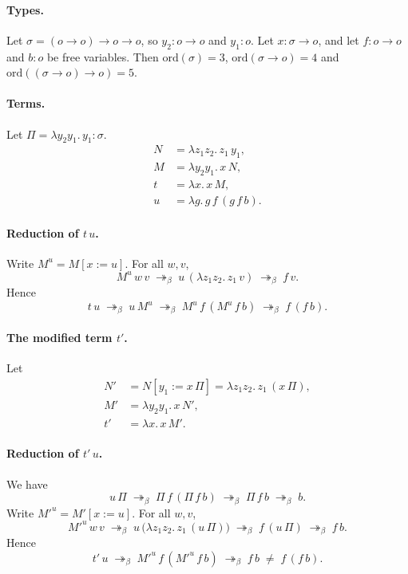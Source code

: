 \documentclass{article}
\newcommand{\red}{\twoheadrightarrow_\beta}
\begin{document}
\paragraph{Types.}
Let $\sigma = (o\to o)\to o\to o$, so $y_2 : o\to o$ and $y_1 : o$.
Let $x : \sigma\to o$, and let $f : o\to o$ and $b : o$ be free variables.
Then $\mathrm{ord}(\sigma) = 3$, $\mathrm{ord}(\sigma\to o) = 4$ and
$\mathrm{ord}((\sigma\to o)\to o) = 5$.

\paragraph{Terms.}
Let $\Pi = \lambda y_2 y_1.\,y_1 : \sigma$.
\begin{align*}
  N &= \lambda z_1 z_2.\, z_1\, y_1, \\
  M &= \lambda y_2 y_1.\, x\, N, \\
  t &= \lambda x.\, x\, M, \\
  u &= \lambda g.\, g\, f\, (g\, f\, b).
\end{align*}

\paragraph{Reduction of $t\,u$.}
Write $M^u = M[x := u]$. For all $w, v$,
\[
  M^u\, w\, v \;\red\; u\, (\lambda z_1 z_2.\, z_1\, v) \;\red\; f\, v .
\]
Hence
\[
  t\,u \;\red\; u\, M^u \;\red\; M^u\, f\, (M^u\, f\, b) \;\red\; f\,(f\,b) .
\]

\paragraph{The modified term $t'$.}
Let
\begin{align*}
  N' &= N[y_1 := x\,\Pi] = \lambda z_1 z_2.\, z_1\, (x\,\Pi), \\
  M' &= \lambda y_2 y_1.\, x\, N', \\
  t' &= \lambda x.\, x\, M'.
\end{align*}

\paragraph{Reduction of $t'\,u$.}
We have
\[
  u\,\Pi \;\red\; \Pi\, f\, (\Pi\, f\, b) \;\red\; \Pi\, f\, b \;\red\; b .
\]
Write $M'^u = M'[x := u]$. For all $w, v$,
\[
  M'^u\, w\, v \;\red\; u\, \bigl(\lambda z_1 z_2.\, z_1\, (u\,\Pi)\bigr) \;\red\; f\,(u\,\Pi) \;\red\; f\, b .
\]
Hence
\[
  t'\,u \;\red\; M'^u\, f\, (M'^u\, f\, b) \;\red\; f\, b \;\neq\; f\,(f\,b) .
\]
\end{document}
